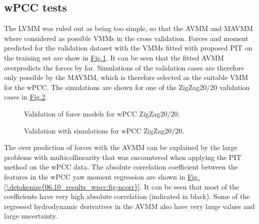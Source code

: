 \documentclass[review]{elsarticle}
\begin{document}
\subsection{wPCC tests}
\label{\detokenize{06.10_results_wpcc:wpcc-tests}}\label{\detokenize{06.10_results_wpcc::doc}}
\sphinxAtStartPar
The LVMM was ruled out as being too simple, so that the AVMM and MAVMM where considered as possible VMMs in the cross validation.
Forces and moment predicted for the validation dataset with the VMMs fitted with proposed PIT on the training set are show in \hyperref[\detokenize{06.10_results_wpcc:fig-validation-forces}]{Fig.\@ \ref{\detokenize{06.10_results_wpcc:fig-validation-forces}}}. It can be seen that the fitted AVMM overpredicts the forces by far. Simulations of the validation cases are therefore only possible by the MAVMM, which is therefore selected as the suitable VMM for the wPCC. 
The simulations are shown for one of the ZigZag20/20 validation cases in \hyperref[\detokenize{06.10_results_wpcc:fig-validation-sim}]{Fig.\@ \ref{\detokenize{06.10_results_wpcc:fig-validation-sim}}}.

\begin{figure}[H]
\centering
\capstart

\noindent{}
\caption{Validation of force models for wPCC ZigZag20/20.}\label{\detokenize{06.10_results_wpcc:fig-validation-forces}}\end{figure}

\begin{figure}[H]
\centering
\capstart

\noindent{}
\caption{Validation with simulations for wPCC ZigZag20/20.}\label{\detokenize{06.10_results_wpcc:fig-validation-sim}}\end{figure}

The over prediction of forces with the AVMM can be explained by the large problems with multicollinearity that was encountered when applying the PIT method on the wPCC data. The absolute correlation coefficient between the features in the wPCC yaw moment regression are shown in \hyperref[\detokenize{06.10_results_wpcc:fig-ncorr}]{Fig.\@ \ref{\detokenize{06.10_results_wpcc:fig-ncorr}}}. It can be seen that most of the coefficients have very high absolute correlation (indicated in black). Some of the regressed hydrodynamic derivatives in the AVMM also have very large values and large uncertainty. 
\end{document}
